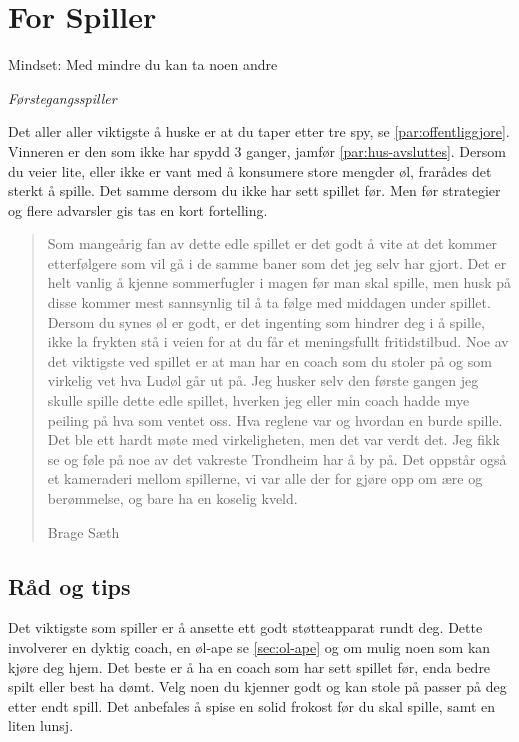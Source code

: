\documentclass[10pt,a4paper,norsk,openany]{book}
\begin{document}
\chapter{For Spiller}

\epigraph{Mindset:  Med mindre du kan ta
  noen andre}{\textit{Førstegangsspiller}}

Det aller aller viktigste å huske er at du taper etter tre spy, se
\cref{par:offentliggjore}. Vinneren er den som ikke har spydd 3 ganger, jamfør
\cref{par:hus-avsluttes}. Dersom du veier lite, eller ikke er vant med å
konsumere store mengder øl, frarådes det sterkt å spille. Det samme dersom du
ikke har sett spillet før. Men før strategier og flere advarsler gis tas en kort
fortelling.

\blockquote[Brage Sæth]{%
  Som mangeårig fan av dette edle spillet er det godt å vite at det kommer
  etterfølgere som vil gå i de samme baner som det jeg selv har gjort. Det er
  helt vanlig å kjenne sommerfugler i magen før man skal spille, men husk på
  disse kommer mest sannsynlig til å ta følge med middagen under spillet. Dersom
  du synes øl er godt, er det ingenting som hindrer deg i å spille, ikke la
  frykten stå i veien for at du får et meningsfullt fritidstilbud. Noe av det
  viktigste ved spillet er at man har en coach som du stoler på og som virkelig
  vet hva Ludøl går ut på. Jeg husker selv den første gangen jeg skulle spille
  dette edle spillet, hverken jeg eller min coach hadde mye peiling på hva som
  ventet oss. Hva reglene var og hvordan en burde spille. Det ble ett hardt møte
  med virkeligheten, men det var verdt det. Jeg fikk se og føle på noe av det
  vakreste Trondheim har å by på. Det oppstår også et kameraderi mellom
  spillerne, vi var alle der for gjøre opp om ære og berømmelse, og bare ha en
  koselig kveld.}


\section{Råd og tips}

Det viktigste som spiller er å ansette ett godt støtteapparat rundt deg. Dette
involverer en dyktig coach, en øl-ape se \cref{sec:ol-ape} og om mulig noen som
kan kjøre deg hjem. Det beste er å ha en coach som har sett spillet før, enda
bedre spilt eller best ha dømt. Velg noen du kjenner godt og kan stole på passer
på deg etter endt spill. Det anbefales å spise en solid frokost før du skal
spille, samt en liten lunsj.
\end{document}
